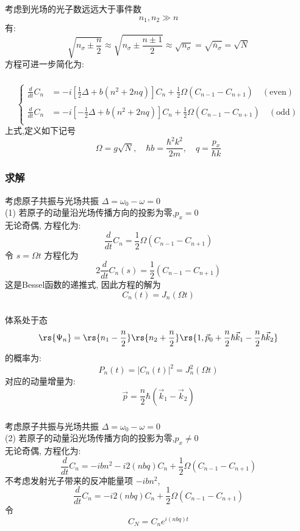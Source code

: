     \begin{frame} 
    \frametitle{}
         考虑到光场的光子数远远大于事件数
         \[ n_1, n_2 \gg n \]
         有: 
         \[ \sqrt{n_\sigma \pm  \frac{n}{2}}  \approx \sqrt{n_\sigma \pm  \frac{n\pm 1}{2}} \approx  \sqrt{n_\sigma} = \sqrt{\bar{n}_\sigma} = \sqrt{N}\]
         方程可进一步简化为:
    \end{frame}
    
    \begin{frame} 
    \frametitle{}
             
            \[ \begin{cases}
                \frac{d  }{d t} C_n &= - i \left[ \frac{1}{2} \Delta + b (n^2 +2nq)  \right] C_n + \frac{1}{2} \Omega (C_{n-1} - C_{n+1})  \quad (\text{even})\\ 
                ~\\
                \frac{d  }{d t} C_n &= - i \left[ - \frac{1}{2} \Delta + b (n^2 +2nq)  \right] C_n + \frac{1}{2} \Omega (C_{n-1} - C_{n+1}) \quad (\text{odd}) \\  
            \end{cases} \]
    上式,定义如下记号
    \[ \Omega = g \sqrt{N}, \quad \hbar b = \frac{\hbar ^2 k^2}{2m}, \quad q = \frac{p_x}{\hbar k} \]
    \end{frame}

    \begin{frame} 
    \frametitle{求解}
    考虑原子共振与光场共振 $\Delta = \omega_0 - \omega =0$ \\ 
         (1) 若原子的动量沿光场传播方向的投影为零,$p_x =0$ \\ 
        无论奇偶, 方程化为:
        \[ \frac{d  }{d t} C_n = \frac{1}{2} \Omega (C_{n-1} - C_{n+1})\]
        令 $s= \Omega t$
        方程化为
        \[ 2\frac{d  }{d t} C_n(s) = \frac{1}{2} (C_{n-1} - C_{n+1})\]
        这是Bessel函数的递推式, 因此方程的解为
        \[C_n(t) = J_n (\Omega t)\]
    \end{frame}

    \begin{frame} 
    \frametitle{}
        体系处于态 \[\rs{\Psi_n} = \rs{n_1 - \frac{n}{2}} \rs{n_2 + \frac{n}{2} }\rs{1,\vec{p}_0 + \frac{n}{2} \hbar \vec{k}_1 - \frac{n}{2}\hbar \vec{k}_2} \]
        的概率为:
        \[ P_n(t) = |C_n(t)|^2 = J_n ^2 (\Omega t) \]
        对应的动量增量为:
        \[ \vec{p} =  \frac{n}{2} \hbar (\vec{k}_1- \vec{k}_2)\]
    \end{frame}

    \begin{frame} 
    \frametitle{}
    考虑原子共振与光场共振 $\Delta = \omega_0 - \omega =0$ \\ 
    (2) 若原子的动量沿光场传播方向的投影为零,$p_x \not =0$ \\ 
    无论奇偶, 方程化为:
    \[ \frac{d  }{d t} C_n =  - i b n^2 -i 2(n b q )C_n + \frac{1}{2} \Omega (C_{n-1} - C_{n+1})\]
    不考虑发射光子带来的反冲能量项 $- i b n^2$, 
    \[ \frac{d  }{d t} C_n =  -i 2(n b q) C_n + \frac{1}{2} \Omega (C_{n-1} - C_{n+1})\]
    令\[ C_N= C_n e^{i(nbq)t}\]
    \end{frame}


